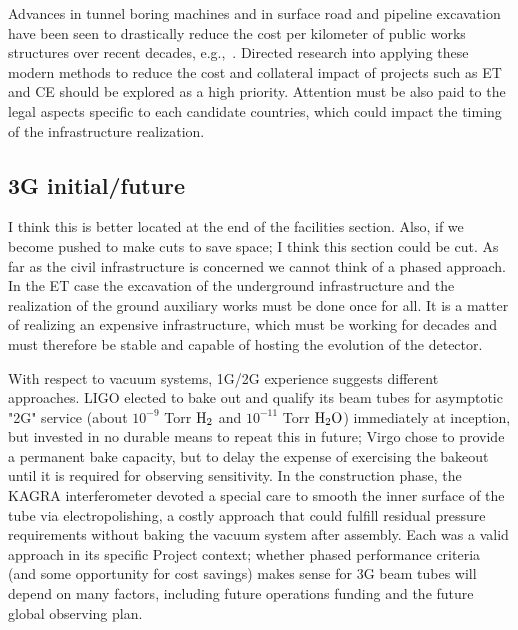 Advances in tunnel boring machines and in surface road and pipeline excavation have been seen to drastically reduce the cost per kilometer of public works structures over recent decades, e.g.,~\cite{BoringCompany}. Directed research into applying these modern methods to reduce the cost and collateral impact of projects such as ET and CE should be explored as a high priority. 
Attention must be also paid to the legal aspects specific to each candidate countries, which could impact the timing of the infrastructure realization. 

\subsection{3G initial/future}

I think this is better located at the end of the facilities section.  Also, if we become pushed to make cuts to save space; I think this section could be cut. 
As far as the civil infrastructure is concerned we cannot think of a phased approach. In the ET case the excavation of the underground infrastructure and the realization of the ground auxiliary works must be done once for all. It is a matter of realizing an expensive infrastructure, which must be working for decades and must therefore be stable  and capable of hosting the evolution of the detector.

With respect to vacuum systems, 1G/2G experience suggests different approaches. LIGO elected to bake out and qualify its beam tubes for asymptotic "2G" service (about $10^{-9}$ Torr $\rm H_2$ and $10^{-11} $ Torr $\rm H_2O$) immediately at inception, but invested in no durable means to repeat this in future; Virgo chose to provide a permanent bake capacity, but to delay the expense of exercising the bakeout until it is required for observing sensitivity. In the construction phase, the  KAGRA interferometer devoted  a special care to smooth   the inner surface of the tube via electropolishing, a costly approach that could fulfill  residual pressure requirements without baking the vacuum system  after assembly.  Each was a valid approach in its specific Project context; whether phased performance criteria (and some opportunity for cost savings) makes sense for 3G beam tubes will depend on many factors, including future operations funding and the future global observing plan.  


